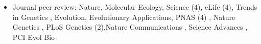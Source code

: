 \documentclass[letterpaper,10pt]{article}
\newcommand{\ignore}[1]{}
\begin{document}
\begin{itemize}
\item Journal peer review:  \ignore {1/26} Nature, \ignore{10/24} Molecular Ecology, \ignore{10/23,5/24,10/24, 5/25} Science (4),   \ignore{2/24,7/23,9/23,2/24} eLife (4),  Trends in Genetics \ignore{9/21}, \newline  \ignore{9/2023} Evolution, \ignore{9/23} Evolutionary Applications, PNAS (4) \ignore{5/24,6/24,10/24,9/25}, Nature Genetics \ignore{7/25},   \ignore{12/23,8/2023} PLoS Genetics (2),\newline Nature Communications \ignore{10/24}, Science Advances \ignore{2/24}, PCI Evol Bio \ignore{6/25}
\end{itemize}
\end{document}
